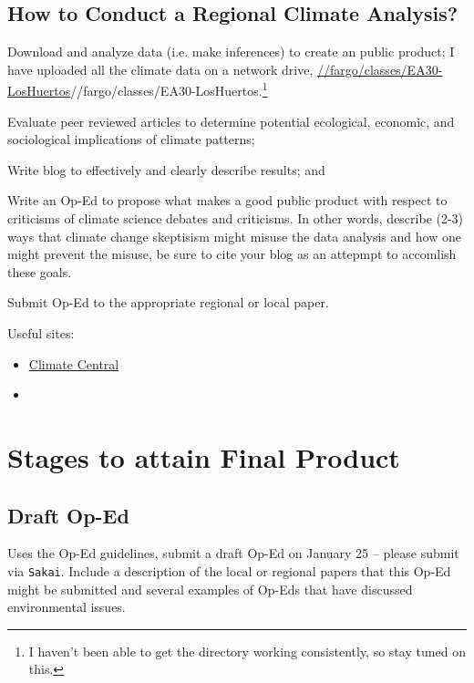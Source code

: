 \documentclass{article}\usepackage[]{graphicx}\usepackage[]{color}
\newenvironment{enumerate*}%
  {\begin{enumerate}%
    \setlength{\itemsep}{0pt}%
    \setlength{\parskip}{0pt}}%
  {\end{enumerate}}
\begin{document}
\subsection{How to Conduct a Regional Climate Analysis?}

\begin{enumerate*}

  \item Download and analyze data (i.e. make inferences) to create an public product; I have uploaded all the climate data on a network drive, \url{//fargo/classes/EA30-LosHuertos}{//fargo/classes/EA30-LosHuertos}.\footnote{I haven't been able to get the directory working consistently, so stay tuned on this.}
  
  \item Evaluate peer reviewed articles to determine potential ecological, economic, and sociological implications of climate patterns; 
  \item Write blog to effectively and clearly describe results; and
  \item Write an Op-Ed to propose what makes a good public product with respect to criticisms of climate science debates and criticisms. In other words, describe (2-3) ways that climate change skeptisism might misuse the data analysis and how one might prevent the misuse, be sure to cite your blog as an attepmpt to accomlish these goals. 
  \item Submit Op-Ed to the appropriate regional or local paper.
\end{enumerate*}

Useful sites: 

\begin{itemize}
  \item \href{http://www.climatecentral.org/news/the-heat-is-on}{Climate Central}
  \item 
\end{itemize}

\section{Stages to attain Final Product}

\subsection{Draft Op-Ed}

Uses the Op-Ed guidelines, submit a draft Op-Ed on January 25 -- please submit via \texttt{Sakai}. Include a description of the local or regional papers that this Op-Ed might be submitted and several examples of Op-Eds that have discussed environmental issues.
\end{document}
